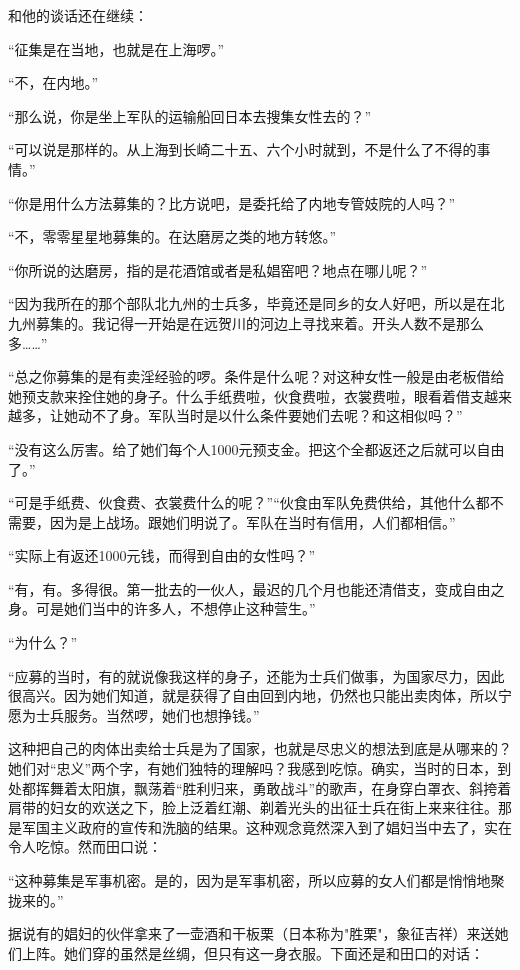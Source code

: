 \documentclass[12pt,UTF8]{ctexbook}
\begin{document}
和他的谈话还在继续：

“征集是在当地，也就是在上海啰。”

“不，在内地。”

“那么说，你是坐上军队的运输船回日本去搜集女性去的？”

“可以说是那样的。从上海到长崎二十五、六个小时就到，不是什么了不得的事情。”

“你是用什么方法募集的？比方说吧，是委托给了内地专管妓院的人吗？”

“不，零零星星地募集的。在达磨房之类的地方转悠。”

“你所说的达磨房，指的是花酒馆或者是私娼窑吧？地点在哪儿呢？”

“因为我所在的那个部队北九州的士兵多，毕竟还是同乡的女人好吧，所以是在北九州募集的。我记得一开始是在远贺川的河边上寻找来着。开头人数不是那么多……”

“总之你募集的是有卖淫经验的啰。条件是什么呢？对这种女性一般是由老板借给她预支款来拴住她的身子。什么手纸费啦，伙食费啦，衣裳费啦，眼看着借支越来越多，让她动不了身。军队当时是以什么条件要她们去呢？和这相似吗？”

“没有这么厉害。给了她们每个人1000元预支金。把这个全都返还之后就可以自由了。”

“可是手纸费、伙食费、衣裳费什么的呢？”“伙食由军队免费供给，其他什么都不需要，因为是上战场。跟她们明说了。军队在当时有信用，人们都相信。”

“实际上有返还1000元钱，而得到自由的女性吗？”

“有，有。多得很。第一批去的一伙人，最迟的几个月也能还清借支，变成自由之身。可是她们当中的许多人，不想停止这种营生。”

“为什么？”

“应募的当时，有的就说像我这样的身子，还能为士兵们做事，为国家尽力，因此很高兴。因为她们知道，就是获得了自由回到内地，仍然也只能出卖肉体，所以宁愿为士兵服务。当然啰，她们也想挣钱。”

这种把自己的肉体出卖给士兵是为了国家，也就是尽忠义的想法到底是从哪来的？她们对“忠义”两个字，有她们独特的理解吗？我感到吃惊。确实，当时的日本，到处都挥舞着太阳旗，飘荡着“胜利归来，勇敢战斗”的歌声，在身穿白罩衣、斜挎着肩带的妇女的欢送之下，脸上泛着红潮、剃着光头的出征士兵在街上来来往往。那是军国主义政府的宣传和洗脑的结果。这种观念竟然深入到了娼妇当中去了，实在令人吃惊。然而田口说：

“这种募集是军事机密。是的，因为是军事机密，所以应募的女人们都是悄悄地聚拢来的。”

据说有的娼妇的伙伴拿来了一壶酒和干板栗（日本称为"胜栗"，象征吉祥）来送她们上阵。她们穿的虽然是丝绸，但只有这一身衣服。下面还是和田口的对话：
\end{document}
